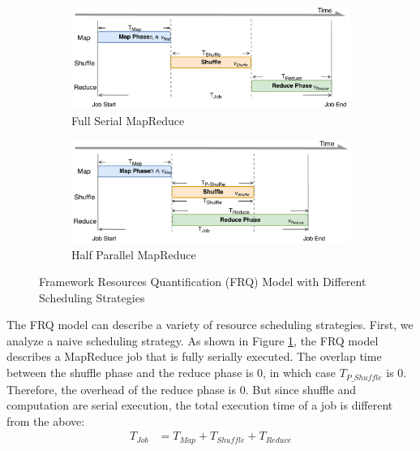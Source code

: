 {\begin{figure}
	\centering
	\begin{subfigure}{0.47\linewidth}
		\includegraphics[width=\linewidth]{fig/model_original}
		\caption{\color{blue}Full Serial MapReduce}
		\label{fig:model_original}
	\end{subfigure}
	\begin{subfigure}{0.47\linewidth}
		\includegraphics[width=\linewidth]{fig/model_hadoop}
		\caption{\color{blue}Half Parallel MapReduce}
		\label{fig:model_hadoop}
	\end{subfigure}
	\caption{\color{blue}Framework Resources Quantification (FRQ) Model with Different Scheduling Strategies}
	\label{fig:model_strategies}
\end{figure}

The FRQ model can describe a variety of resource scheduling strategies. First, we analyze a naive scheduling strategy. As shown in Figure \ref{fig:model_original}, the FRQ model describes a MapReduce job that is fully serially executed. The overlap time between the shuffle phase and the reduce phase is \(0\), in which case \(T_{P\_Shuffle}\) is \(0\). Therefore, the overhead of the reduce phase is 0. But since shuffle and computation are serial execution, the total execution time of a job is different from the above:
\begin{equation}
\label{equation_Tjob2}
\begin{aligned}
    T_{Job} &= T_{Map} + T_{Shuffle} + T_{Reduce}
\end{aligned}
\end{equation}

}
